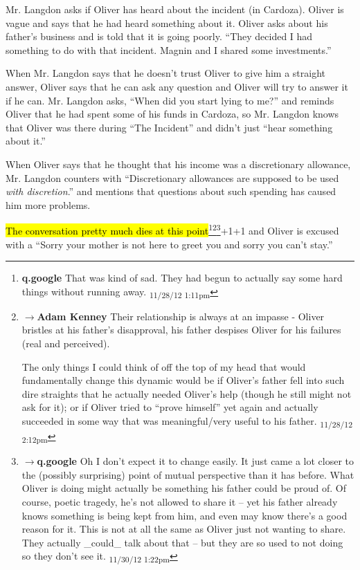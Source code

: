 Mr. Langdon asks if Oliver has heard about the incident (in Cardoza).  Oliver is vague and says that he had heard something about it.  Oliver asks about his father's business and is told that it is going poorly.  ``They decided I had something to do with that incident. Magnin and I shared some investments.''



When Mr. Langdon says that he doesn't trust Oliver to give him a straight answer, Oliver says that he can ask any question and Oliver will try to answer it if he can.  Mr. Langdon asks, ``When did you start lying to me?'' and reminds Oliver that he had spent some of his funds in Cardoza, so Mr. Langdon knows that Oliver was there during ``The Incident'' and didn't just ``hear something about it.''



When Oliver says that he thought that his income was a discretionary allowance, Mr. Langdon counters with ``Discretionary allowances are supposed to be used \textit{with discretion}.'' and mentions that questions about such spending has caused him more problems.



\hl{The conversation pretty much dies at this point}\footnote{\textbf{q.google }That was kind of sad.  They had begun to actually say some hard things without running away. \textsubscript{11/28/12 1:11pm}}\footnote{$\rightarrow$\textbf{Adam Kenney }Their relationship is always at an impasse - Oliver bristles at his father's disapproval, his father despises Oliver for his failures (real and perceived).

The only things I could think of off the top of my head that would fundamentally change this dynamic would be if Oliver's father fell into such dire straights that he actually needed Oliver's help (though he still might not ask for it); or if Oliver tried to ``prove himself'' yet again and actually succeeded in some way that was meaningful/very useful to his father. \textsubscript{11/28/12 2:12pm}}\footnote{$\rightarrow$\textbf{q.google }Oh I don't expect it to change easily.  It just came a lot closer to the (possibly surprising) point of mutual perspective than it has before.  What Oliver is doing might actually be something his father could be proud of.  Of course, poetic tragedy, he's not allowed to share it -- yet  his father already knows something is being kept from him, and even may know there's a good reason for it.  This is not at all the same as Oliver just not wanting to share. They actually \_could\_ talk about that -- but they are so used to not doing so they don't see it. \textsubscript{11/30/12 1:22pm}}+1+1 and Oliver is excused with a ``Sorry your mother is not here to greet you and sorry you can't stay.''



